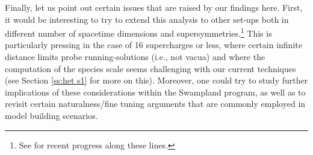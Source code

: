 
Finally, let us point out certain issues that are raised by our findings here. First, it would be interesting to try to extend this analysis to other set-ups both in different number of spacetime dimensions and supersymmetries.\footnote{See \cite{
vandeHeisteeg:2023dlw} for recent progress along these lines.} This is particularly pressing in the case of 16 supercharges or less, where certain infinite distance limits probe running-solutions (i.e., not vacua) \cite{Etheredge:2023odp} and where the computation of the species scale seems challenging with our current techniques (see Section \ref{ss:het s1} for more on this). Moreover, one could try to study further implications of these considerations within the Swampland program, as well as to revisit certain naturalness/fine tuning arguments that are commonly employed in model building scenarios.